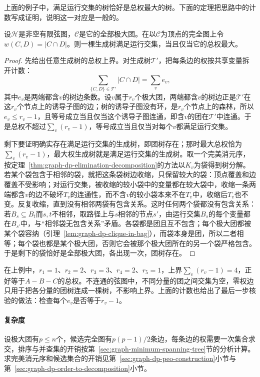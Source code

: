 上面的例子中，满足运行交集的树恰好是总权最大的树。下面的定理把思路中的计数写成证明，说明这一对应是一般的。

\begin{theorem}[团树与最大权生成树]
\label{thm:graph-dp-clique-tree-mst}
设$\mathcal H$是非空有限弦图，$\mathcal C$是它的全部极大团。在以$\mathcal C$为顶点的完全图上令$w(C,D)=|C\cap D|$。则一棵生成树满足运行交集，当且仅当它的总权最大。
\end{theorem}

\begin{proof}
先给出任意生成树的总权上界。对生成树$\mathcal T'$，把每条边的权按共享变量拆开计数：
\[
\sum_{\{C,D\}\in\mathcal T'}|C\cap D|=\sum_{v}e_v,
\]
其中$e_v$是两端都含$v$的树边条数。设$v$属于$r_v$个极大团，两端都含$v$的树边正是$\mathcal T'$在这$r_v$个节点上的诱导子图的边；树的诱导子图没有环，是$r_v$个节点上的森林，所以$e_v\leq r_v-1$，且等号成立当且仅当这个诱导子图连通，即含$v$的团在$\mathcal T'$中连通。于是总权不超过$\sum_v(r_v-1)$，等号成立当且仅当对每个$v$都满足运行交集。

剩下要证明确实存在满足运行交集的生成树，即团树存在；那时最大总权恰为$\sum_v(r_v-1)$，最大权生成树就是满足运行交集的生成树。取一个完美消元序，按定理~\ref{thm:graph-dp-elimination-decomposition}的方法以$K_v$为袋得到树分解。若某个袋包含于相邻的袋，就把这条袋树边收缩，只保留较大的袋：顶点覆盖和边覆盖不受影响；对运行交集，被收缩的较小袋中的变量都在较大袋中，收缩一条两端都含$v$的边不破坏$T_v$的连通性，而不含$v$的较小袋本来不在$T_v$中，收缩后$T_v$也不变。反复收缩，直到没有相邻两袋有包含关系。这时任何两个袋都没有包含关系：若$B_s\subseteq B_t$而$s,t$不相邻，取路径上与$s$相邻的节点$s'$，由运行交集$B_s$的每个变量都在$B_{s'}$中，与“相邻袋无包含关系”矛盾。各袋都是团且互不包含；每个极大团都被某个袋容纳（引理~\ref{lem:graph-dp-clique-in-bag}），而袋本身是团，所以二者相等；每个袋也都是某个极大团，否则它会被那个极大团所在的另一个袋严格包含。于是剩下的袋恰好是全部极大团，各出现一次，团树存在。
\end{proof}

在上例中，$r_1=1$、$r_2=2$、$r_3=3$、$r_4=2$、$r_5=1$，上界$\sum_v(r_v-1)=4$，正好等于$A-B-C$的总权。不连通的弦图中，不同分量的团之间交集为空，零权边只用于把各分量的团树连成一棵树，不影响上界。上面的计数也给出了最后一步核验的做法：检查每个$e_v$是否等于$r_v-1$。

\paragraph{复杂度}
设极大团有$p\leq n$个，候选完全图有$p(p-1)/2$条边，每条边的权需要一次集合求交，排序与并查集的开销按第~\ref{sec:graph-minimum-spanning-tree}节的分析计算。求完美消元序和候选集合的开销见第~\ref{sec:graph-dp-peo-construction}小节与第~\ref{sec:graph-dp-order-to-decomposition}小节。

